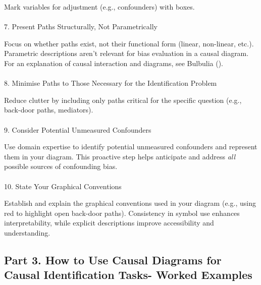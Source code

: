 \documentclass[
  singlecolumn]{article}
\makeatletter
\let\oldparagraph\paragraph
\renewcommand{\paragraph}{
    \@ifstar
      \xxxParagraphStar
      \xxxParagraphNoStar
  }
\newcommand{\xxxParagraphStar}[1]{\oldparagraph*{#1}\mbox{}}
\newcommand{\xxxParagraphNoStar}[1]{\oldparagraph{#1}\mbox{}}
\makeatother
\begin{document}
Mark variables for adjustment (e.g., confounders) with boxes.

\paragraph{7. Present Paths Structurally, Not
Parametrically}\label{present-paths-structurally-not-parametrically}

Focus on whether paths exist, not their functional form (linear,
non-linear, etc.). Parametric descriptions aren't relevant for bias
evaluation in a causal diagram. For an explanation of causal interaction
and diagrams, see Bulbulia ().

\paragraph{8. Minimise Paths to Those Necessary for the Identification
Problem}\label{minimise-paths-to-those-necessary-for-the-identification-problem}

Reduce clutter by including only paths critical for the specific
question (e.g., back-door paths, mediators).

\paragraph{9. Consider Potential Unmeasured
Confounders}\label{consider-potential-unmeasured-confounders}

Use domain expertise to identify potential unmeasured confounders and
represent them in your diagram. This proactive step helps anticipate and
address \emph{all} possible sources of confounding bias.

\paragraph{10. State Your Graphical
Conventions}\label{state-your-graphical-conventions}

Establish and explain the graphical conventions used in your diagram
(e.g., using red to highlight open back-door paths). Consistency in
symbol use enhances interpretability, while explicit descriptions
improve accessibility and understanding.

\subsection{Part 3. How to Use Causal Diagrams for Causal Identification
Tasks- Worked Examples}\label{section-part3}
\end{document}
